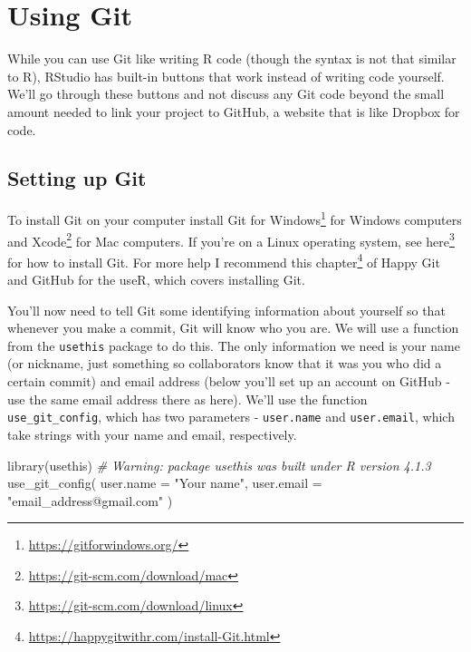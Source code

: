 \documentclass[
  a4paper,
]{krantz}
\makeatletter
\newenvironment{Shaded}{\begin{snugshade}}{\end{snugshade}}
\newcommand{\AttributeTok}[1]{\textcolor[rgb]{0.61,0.61,0.61}{#1}}
\newcommand{\CommentTok}[1]{\textcolor[rgb]{0.37,0.37,0.37}{\textit{#1}}}
\newcommand{\FunctionTok}[1]{\textcolor[rgb]{0,0,0}{#1}}
\newcommand{\NormalTok}[1]{#1}
\newcommand{\StringTok}[1]{\textcolor[rgb]{0.5,0.5,0.5}{#1}}
\renewcommand{\href}[2]{#2\footnote{\url{#1}}}
\newenvironment{kframe}{%
\medskip{}
\setlength{\fboxsep}{.8em}
 \def\at@end@of@kframe{}%
 \ifinner\ifhmode%
  \def\at@end@of@kframe{\end{minipage}}%
  \begin{minipage}{\columnwidth}%
 \fi\fi%
 \def\FrameCommand##1{\hskip\@totalleftmargin \hskip-\fboxsep
 \colorbox{shadecolor}{##1}\hskip-\fboxsep
     \hskip-\linewidth \hskip-\@totalleftmargin \hskip\columnwidth}%
 \MakeFramed {\advance\hsize-\width
   \@totalleftmargin\z@ \linewidth\hsize
   \@setminipage}}%
 {\par\unskip\endMakeFramed%
 \at@end@of@kframe}
\renewenvironment{Shaded}{\begin{kframe}}{\end{kframe}}
\makeatother
\begin{document}
\hypertarget{using-git}{%
\section{Using Git}\label{using-git}}

While you can use Git like writing R code (though the syntax
is not that similar to R), RStudio has built-in buttons that
work instead of writing code yourself. We'll go through
these buttons and not discuss any Git code beyond the small
amount needed to link your project to GitHub, a website that
is like Dropbox for code.

\hypertarget{setting-up-git}{%
\subsection{Setting up Git}\label{setting-up-git}}

To install Git on your computer install
\href{https://gitforwindows.org/}{Git for Windows} for
Windows computers and
\href{https://git-scm.com/download/mac}{Xcode} for Mac
computers. If you're on a Linux operating system, see
\href{https://git-scm.com/download/linux}{here} for how to
install Git. For more help I recommend
\href{https://happygitwithr.com/install-Git.html}{this
chapter} of Happy Git and GitHub for the useR, which covers
installing Git.

You'll now need to tell Git some identifying information
about yourself so that whenever you make a commit, Git will
know who you are. We will use a function from the
\texttt{usethis} package to do this. The only information we
need is your name (or nickname, just something so
collaborators know that it was you who did a certain commit)
and email address (below you'll set up an account on GitHub
- use the same email address there as here). We'll use the
function \texttt{use\_git\_config}, which has two parameters
- \texttt{user.name} and \texttt{user.email}, which take
strings with your name and email, respectively.

\begin{Shaded}
\begin{Highlighting}[]
\FunctionTok{library}\NormalTok{(usethis)}
\CommentTok{\# Warning: package \textquotesingle{}usethis\textquotesingle{} was built under R version 4.1.3}
\FunctionTok{use\_git\_config}\NormalTok{(}
  \AttributeTok{user.name =} \StringTok{"Your name"}\NormalTok{,}
  \AttributeTok{user.email =} \StringTok{"email\_address@gmail.com"}
\NormalTok{)}
\end{Highlighting}
\end{Shaded}
\end{document}

